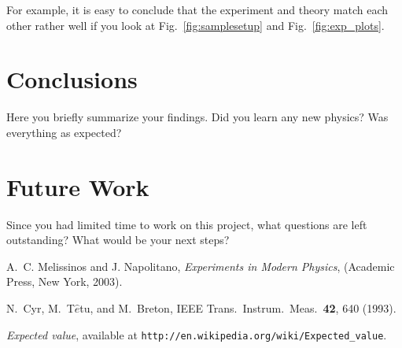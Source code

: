\documentclass[letterpaper,12pt]{article}
\begin{document}
For example, it is easy to conclude that the
experiment and theory match each other rather well if you look at
Fig.~\ref{fig:samplesetup} and Fig.~\ref{fig:exp_plots}.


\section{Conclusions}
Here you briefly summarize your findings. Did you learn any new physics? Was everything as expected?

\blindtext

\section{Future Work}
Since you had limited time to work on this project, what questions are left outstanding? What would be your next steps? 

\blindtext


\begin{thebibliography}{99}

A.~C. Melissinos and J. Napolitano, \textit{Experiments in Modern Physics},
(Academic Press, New York, 2003).

N.\ Cyr, M.\ T$\hat{e}$tu, and M.\ Breton,
IEEE Trans.\ Instrum.\ Meas.\ \textbf{42}, 640 (1993).

 \emph{Expected value},  available at
\texttt{http://en.wikipedia.org/wiki/Expected\_value}.

\end{thebibliography}
\end{document}
